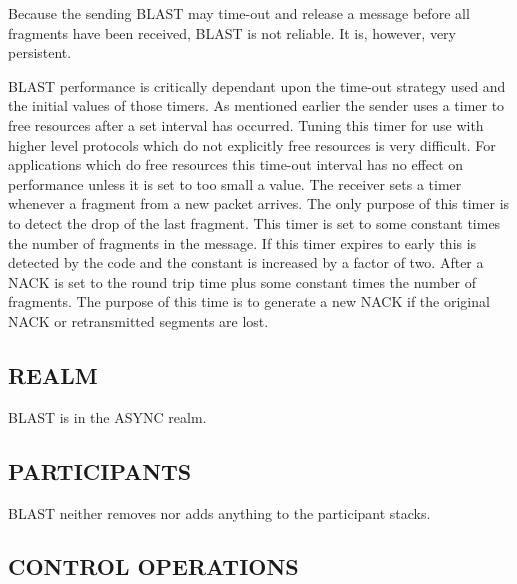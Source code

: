 Because the sending BLAST may time-out and release a message before all
fragments have been received, BLAST is not reliable. 
It is, however, very persistent.

BLAST performance is critically dependant upon the time-out 
strategy used and the initial values of those timers. As mentioned 
earlier the sender uses a timer to free resources after a set 
interval has occurred. Tuning this timer for use with higher 
level protocols which do not explicitly free resources is very 
difficult. For applications which do free resources this time-out 
interval has no effect on performance unless it is set to too small a 
value. The receiver sets a timer whenever a fragment from a 
new packet arrives. The only purpose of this timer is to detect 
the drop of the last fragment. This timer is set to some constant
times the number of fragments in the message. If this timer 
expires to early this is detected by the code and the constant 
is increased by a factor of two. After a NACK is set to the 
round trip time plus some constant times the number of 
fragments. The purpose of this time is to generate a new NACK
if the original NACK or retransmitted segments are lost. 


\subsection*{REALM}

BLAST is in the ASYNC realm.

\subsection*{PARTICIPANTS}

BLAST neither removes nor adds anything to the participant stacks.

\subsection*{CONTROL OPERATIONS}

